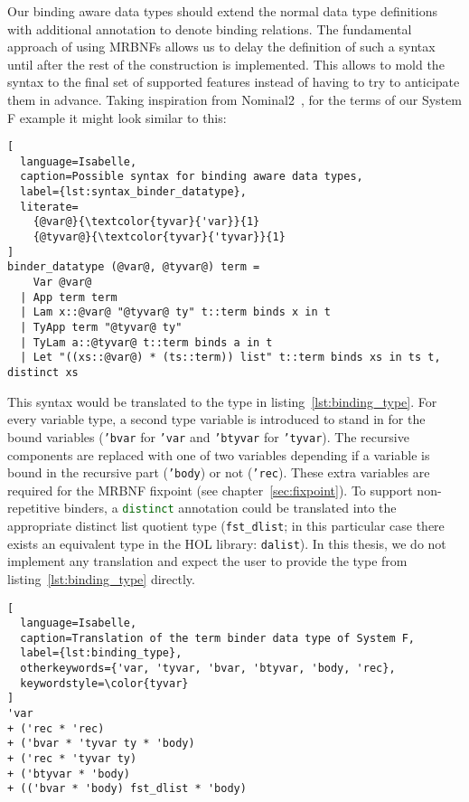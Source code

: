 Our binding aware data types should extend the normal data type definitions with additional annotation to denote binding relations. The fundamental approach of using \acp{MRBNF} allows us to delay the definition of such a syntax until after the rest of the construction is implemented. This allows to mold the syntax to the final set of supported features instead of having to try to anticipate them in advance. Taking inspiration from Nominal2~\cite{nominal2}, for the terms of our System F example it might look similar to this:

\begin{lstlisting}[
  language=Isabelle,
  caption=Possible syntax for binding aware data types,
  label={lst:syntax_binder_datatype},
  literate=
    {@var@}{\textcolor{tyvar}{'var}}{1}
    {@tyvar@}{\textcolor{tyvar}{'tyvar}}{1}
]
binder_datatype (@var@, @tyvar@) term =
    Var @var@
  | App term term
  | Lam x::@var@ "@tyvar@ ty" t::term binds x in t
  | TyApp term "@tyvar@ ty"
  | TyLam a::@tyvar@ t::term binds a in t
  | Let "((xs::@var@) * (ts::term)) list" t::term binds xs in ts t, distinct xs
\end{lstlisting}

This syntax would be translated to the type in listing~\ref{lst:binding_type}. For every variable type, a second type variable is introduced to stand in for the bound variables (\texttt{\textcolor{tyvar}{'bvar}} for \texttt{\textcolor{tyvar}{'var}} and \texttt{\textcolor{tyvar}{'btyvar}} for \texttt{\textcolor{tyvar}{'tyvar}}). The recursive components are replaced with one of two variables depending if a variable is bound in the recursive part (\texttt{\textcolor{tyvar}{'body}}) or not (\texttt{\textcolor{tyvar}{'rec}}). These extra variables are required for the \ac{MRBNF} fixpoint (see chapter~\ref{sec:fixpoint}). To support non-repetitive binders, a \texttt{\textcolor{darkgreen}{distinct}} annotation could be translated into the appropriate distinct list quotient type (\texttt{fst\_dlist}; in this particular case there exists an equivalent type in the \ac{HOL} library: \texttt{dalist}). In this thesis, we do not implement any translation and expect the user to provide the type from listing~\ref{lst:binding_type} directly.

\begin{lstlisting}[
  language=Isabelle,
  caption=Translation of the term binder data type of System F,
  label={lst:binding_type},
  otherkeywords={'var, 'tyvar, 'bvar, 'btyvar, 'body, 'rec},
  keywordstyle=\color{tyvar}
]
'var
+ ('rec * 'rec)
+ ('bvar * 'tyvar ty * 'body)
+ ('rec * 'tyvar ty)
+ ('btyvar * 'body)
+ (('bvar * 'body) fst_dlist * 'body)
\end{lstlisting}


